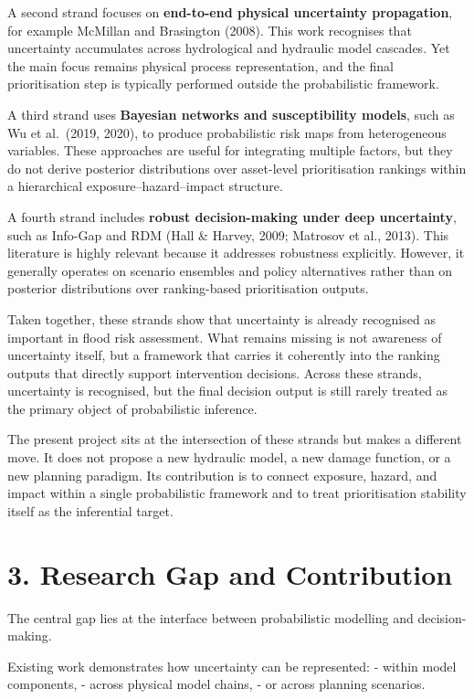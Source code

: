 \documentclass[
]{article}
\begin{document}
A second strand focuses on \textbf{end-to-end physical uncertainty
propagation}, for example McMillan and Brasington (2008). This work
recognises that uncertainty accumulates across hydrological and
hydraulic model cascades. Yet the main focus remains physical process
representation, and the final prioritisation step is typically performed
outside the probabilistic framework.

A third strand uses \textbf{Bayesian networks and susceptibility
models}, such as Wu et al.~(2019, 2020), to produce probabilistic risk
maps from heterogeneous variables. These approaches are useful for
integrating multiple factors, but they do not derive posterior
distributions over asset-level prioritisation rankings within a
hierarchical exposure--hazard--impact structure.

A fourth strand includes \textbf{robust decision-making under deep
uncertainty}, such as Info-Gap and RDM (Hall \& Harvey, 2009; Matrosov
et al., 2013). This literature is highly relevant because it addresses
robustness explicitly. However, it generally operates on scenario
ensembles and policy alternatives rather than on posterior distributions
over ranking-based prioritisation outputs.

Taken together, these strands show that uncertainty is already
recognised as important in flood risk assessment. What remains missing
is not awareness of uncertainty itself, but a framework that carries it
coherently into the ranking outputs that directly support intervention
decisions. Across these strands, uncertainty is recognised, but the
final decision output is still rarely treated as the primary object of
probabilistic inference.

The present project sits at the intersection of these strands but makes
a different move. It does not propose a new hydraulic model, a new
damage function, or a new planning paradigm. Its contribution is to
connect exposure, hazard, and impact within a single probabilistic
framework and to treat prioritisation stability itself as the
inferential target.

\section{3. Research Gap and
Contribution}\label{research-gap-and-contribution}

The central gap lies at the interface between probabilistic modelling
and decision-making.

Existing work demonstrates how uncertainty can be represented: - within
model components, - across physical model chains, - or across planning
scenarios.
\end{document}
